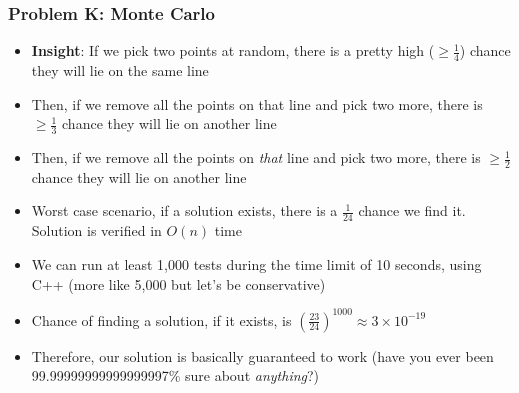 \begin{frame}
  \frametitle{Problem K: Monte Carlo}

  \begin{itemize}
    \item \textbf{Insight}: If we pick two points at random, there is a pretty high ($\ge \frac{1}{4}$) chance they will lie on the same line
    \item Then, if we remove all the points on that line and pick two more, there is $\ge \frac{1}{3}$ chance they will lie on another line
    \item Then, if we remove all the points on \textit{that} line and pick two more, there is $\ge \frac{1}{2}$ chance they will lie on another line
    \item Worst case scenario, if a solution exists, there is a $\frac{1}{24}$ chance we find it. Solution is verified in $O(n)$ time
    \item We can run at least 1,000 tests during the time limit of 10 seconds, using C++ (more like 5,000 but let's be conservative)
    \item Chance of finding a solution, if it exists, is $(\frac{23}{24})^{1000} \approx 3 \times 10^{-19}$
    \item Therefore, our solution is basically guaranteed to work (have you ever been 99.99999999999999997\% sure about \textit{anything}?)
  \end{itemize}
  
\end{frame}
